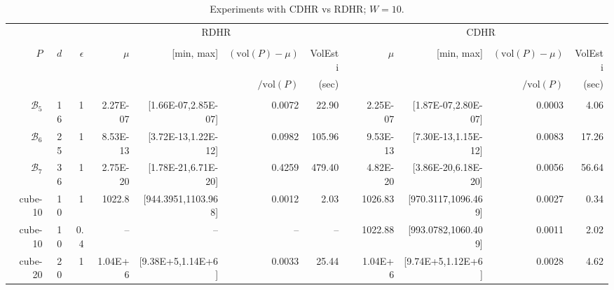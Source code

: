 \documentclass[11pt,a4paper]{article}
\def\B{{\mathcal B}} \def\E{{\mathcal E}}
\def\vol{\mbox{vol}}
\def\vol{\mbox{vol}}
\begin{document}
\begin{table}[t]\centering\tiny
\begin{tabular*}{\linewidth}{@{\extracolsep{\fill}}rr@{~~}r@{~~}rrrr@{}rrr@{~}r@{~}r}
& & & \multicolumn{4}{c}{RDHR} & & \multicolumn{4}{c}{CDHR}\\\cline{4-7}\cline{9-12}\\[-.5em]
$P$ & $d$ & $\epsilon$ & $\mu$ & [min, max] & $(\vol(P)-\mu)$ & VolEsti & & $\mu$ & [min, max] & $(\vol(P)-\mu)$ & VolEsti  \\ 
 &  &  &  &  &   $/\vol(P)$ & (sec) &  &  &  &  $/\vol(P)$ & (sec) \\\hline\\[-.5em]
$\B_5$ & 16 & 1 & 2.27E-07 & [1.66E-07,2.85E-07] &  0.0072 & 22.90 & &  2.25E-07 & [1.87E-07,2.80E-07] & 0.0003 & 4.06\\
$\B_6$ & 25 & 1 & 8.53E-13 & [3.72E-13,1.22E-12] &  0.0982 & 105.96 & &  9.53E-13 & [7.30E-13,1.15E-12] & 0.0083 & 17.26\\
$\B_7$ & 36 & 1 & 2.75E-20 & [1.78E-21,6.71E-20] &  0.4259 & 479.40 & &  4.82E-20 & [3.86E-20,6.18E-20] & 0.0056 & 56.64\\
cube-10 & 10 & 1 & 1022.8 & [944.3951,1103.968] & 0.0012 & 2.03 & &  1026.83 & [970.3117,1096.469] & 0.0027 & 0.34\\
cube-10 & 10 & 0.4 & --  & -- & --  & -- & &  1022.88 & [993.0782,1060.409] & 0.0011 & 2.02\\
cube-20 & 20 & 1 & 1.04E+6 & [9.38E+5,1.14E+6] & 0.0033 & 25.44 & &  1.04E+6 & [9.74E+5,1.12E+6] & 0.0028 & 4.62\\
\end{tabular*} 
\caption{ Experiments with CDHR vs RDHR; $W=10$. 
\label{table:hnr_compare}}
\end{table}
\end{document}
